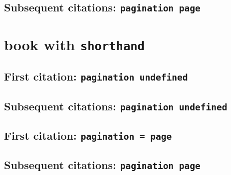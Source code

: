 \documentclass[a4paper]{article}
\begin{document}
\cite{talbert:1992:a}

\citereset
\cite[4]{talbert:1992:a}

\citereset
\cite[note]{talbert:1992:a}

\subsection{Subsequent citations: \texttt{pagination page}}

\cite{talbert:1992:a}

\cite[4]{talbert:1992:a}

\cite[note]{talbert:1992:a}

\section{book with \texttt{shorthand}}

\subsection{First citation: \texttt{pagination undefined}}

\cite{BDAG}

\citereset
\cite[4]{BDAG}

\citereset
\cite[note]{BDAG}

\subsection{Subsequent citations: \texttt{pagination undefined}}

\cite{BDAG}

\cite[4]{BDAG}

\cite[note]{BDAG}

\subsection{First citation: \texttt{pagination = page}}

\cite{BDAG:a}

\citereset
\cite[4]{BDAG:a}

\citereset
\cite[note]{BDAG:a}

\subsection{Subsequent citations: \texttt{pagination page}}

\cite{BDAG:a}

\cite[4]{BDAG:a}
\end{document}
